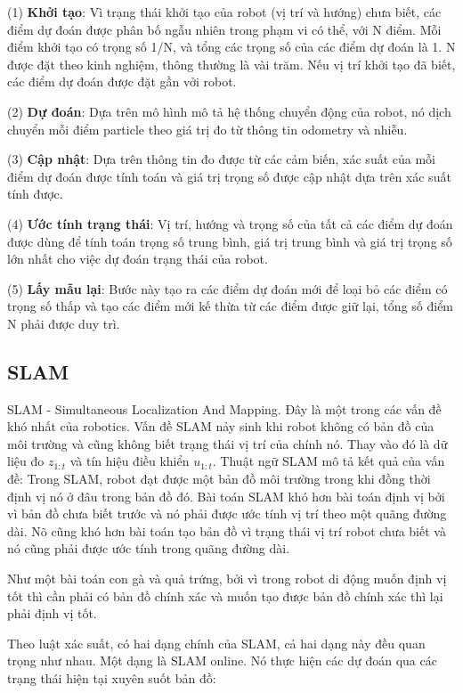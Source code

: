 {{(1) \textbf{Khởi tạo}:
Vì trạng thái khởi tạo của robot (vị trí và hướng) chưa biết, các điểm dự đoán được phân bố ngẫu nhiên trong phạm vi có thể, với N điểm. Mỗi điểm khởi tạo có trọng số 1/N, và tổng các trọng số của các điểm dự đoán là 1. N được đặt theo kinh nghiệm, thông thường là vài trăm. Nếu vị trí khởi tạo đã biết, các điểm dự đoán được đặt gần vởi robot.

(2) \textbf{Dự đoán}: Dựa trên mô hình mô tả hệ thống chuyển động của robot, nó dịch chuyển mỗi điểm particle theo giá trị đo từ thông tin odometry và nhiễu.

(3) \textbf{Cập nhật}: Dựa trên thông tin đo được từ các cảm biến, xác suất của mỗi điểm dự đoán được tính toán và giá trị trọng số được cập nhật dựa trên xác suất tính được.

(4) \textbf{Ước tính trạng thái}: Vị trí, hướng và trọng số của tất cả các điểm dự đoán được dùng để tính toán trọng số trung bình, giá trị trung bình và giá trị trọng số lớn nhất cho việc dự đoán trạng thái của robot.

(5) \textbf{Lấy mẫu lại}: Bước này tạo ra các điểm dự đoán mới để loại bỏ các điểm có trọng số thấp và tạo các điểm mới kế thừa từ các điểm được giữ lại, tổng số điểm N phải được duy trì.

\subsection{SLAM}

SLAM - Simultaneous Localization And Mapping. Đây là một trong các vấn đề khó nhất của robotics. Vấn đề SLAM nảy sinh khi robot không có bản đồ của môi trường và cũng không biết trạng thái vị trí của chính nó. Thay vào đó là dữ liệu đo ${z}_{1:t}$ và tín hiệu điều khiển ${u}_{1:t}$. Thuật ngữ SLAM mô tả kết quả của vấn đề: Trong SLAM, robot đạt được một bản đồ môi trường trong khi đồng thời định vị nó ở đâu trong bản đồ đó. Bài toán SLAM khó hơn bài toán định vị bởi vì bản đồ chưa biết trước và nó phải được ước tính vị trí theo một quãng đường dài. Nõ cũng khó hơn bài toán tạo bản đồ vì trạng thái vị trí robot chưa biết và nó cũng phải được ước tính trong quãng đường dài.

Như một bài toán con gà và quả trứng, bởi vì trong robot di động muốn định vị tốt thì cần phải có bản đồ chính xác và muốn tạo được bản đồ chính xác thì lại phải định vị tốt.

Theo luật xác suất, có hai dạng chính của SLAM, cả hai dạng này đều quan trọng như nhau. Một dạng là SLAM online. Nó thực hiện các dự đoán qua các trạng thái hiện tại xuyên suốt bản đồ:

}}
